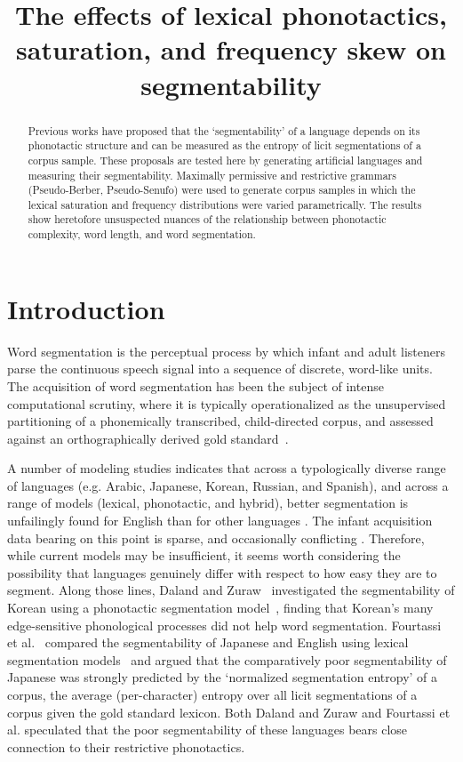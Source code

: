 \documentclass[11pt]{article}
\title{The effects of lexical phonotactics, saturation,
  and frequency skew on segmentability}
\date{}
\begin{document}
\maketitle
\begin{abstract}
  Previous works have proposed that the `segmentability' of a language
  depends on its phonotactic structure and can be measured as the
  entropy of licit segmentations of a corpus sample. These proposals
  are tested here by generating artificial languages and measuring
  their segmentability. Maximally permissive and restrictive grammars
  (Pseudo-Berber, Pseudo-Senufo) were used to generate corpus samples 
  in which the lexical saturation and frequency distributions were
  varied parametrically. The results show heretofore  unsuspected
  nuances of the relationship between phonotactic complexity, word
  length, and word segmentation.
\end{abstract}


\section{Introduction}
\vspace*{-5pt}
Word segmentation is the perceptual process by which infant and adult listeners parse the continuous speech signal into a sequence of discrete, word-like units. The acquisition of word segmentation has been the subject of intense computational scrutiny, where it is typically operationalized as the unsupervised partitioning of a phonemically transcribed, child-directed corpus, and assessed against an orthographically derived gold standard~\cite{Goldwater09a,Daland11a,Pearl10b}.

A number of modeling studies indicates that across a typologically diverse range of languages (e.g. Arabic, Japanese, Korean, Russian, and Spanish), and across a range of models (lexical, phonotactic, and hybrid), better segmentation is unfailingly found for English than for other languages \cite{Fleck08a,Daland09a,Fourtassi13a,Daland13a}. The infant acquisition data bearing on this point is sparse, and occasionally conflicting \cite{Nazzi06a,Nazzi14a}. Therefore, while current models may be insufficient, it seems worth considering the possibility that languages genuinely differ with respect to how easy they are to segment. Along those lines, Daland and Zuraw~ investigated the segmentability of Korean using a phonotactic segmentation model~\cite{Daland11a}, finding that Korean's many edge-sensitive phonological processes did not help word segmentation. Fourtassi et al.~ compared the segmentability of Japanese and English using lexical segmentation models~\cite{Goldwater09a,Johnson09a} and argued that the comparatively poor segmentability of Japanese was strongly predicted by the `normalized segmentation entropy' of a corpus, the average (per-character) entropy over all licit segmentations of a corpus given the gold standard lexicon. Both Daland and Zuraw and Fourtassi et al. speculated that the poor segmentability of these languages bears close connection to their restrictive phonotactics.
\end{document}
